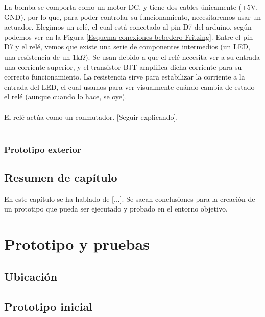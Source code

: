 \documentclass[12pt]{article}
\begin{document}
	\noindent La bomba se comporta como un motor DC, y tiene dos cables únicamente (+5V, GND), por lo que, para poder controlar su funcionamiento, necesitaremos usar un actuador. Elegimos un relé, el cual está conectado al pin D7 del arduino, según podemos ver en la Figura \ref{Esquema conexiones bebedero Fritzing}. Entre el pin D7 y el relé, vemos que existe una serie de componentes intermedios (un LED, una resistencia de un 1k$\Omega$). Se usan debido a que el relé necesita ver a su entrada una corriente superior, y el transistor BJT amplifica dicha corriente para su correcto funcionamiento. La resistencia sirve para estabilizar la corriente a la entrada del LED, el cual usamos para ver visualmente cuándo cambia de estado el relé (aunque cuando lo hace, se oye). \\
	
	 \\
	
	\noindent El relé actúa como un conmutador. [Seguir explicando]. \\
	
	 \\
	
	\subsubsection{Prototipo exterior}
		
	\subsection[Resumen del capítulo]{Resumen de capítulo}
	
	En este capítulo se ha hablado de [...]. Se sacan conclusiones para la creación de un prototipo que pueda ser ejecutado y probado en el entorno objetivo.
	\pagebreak
	
	
	\section[Prototipo y pruebas]{Prototipo y pruebas}
	
	\subsection[Ubicación]{Ubicación}
	\subsection[Prototipo inicial]{Prototipo inicial}
	
\end{document}
